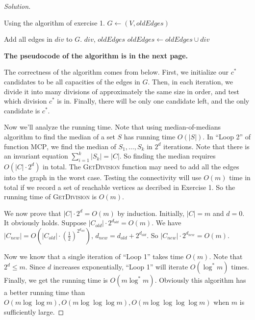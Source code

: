 \begin{proof}[Solution]
\begin{algorithm}
\begin{algorithmic}
                \bigskip
                
                 \Comment Using the algorithm of exercise 1.
                    \State $G\gets (V, oldEdges)$
                    
                        \State Add all edges in $div$ to $G$.
                            \State \Return $div$, $oldEdges$
                        \Else
                            \State $oldEdges \gets oldEdges \cup div$
                        \EndIf
                    \EndFor
                \EndFunction
            \end{algorithmic}
        \end{algorithm}
    
        {\bf The pseudocode of the algorithm is in the next page.}
    
        The correctness of the algorithm comes from below.
        First, we initialize our $c^*$ candidates to be all capacities of the edges in $G$.
        Then, in each iteration, we divide it into many divisions of approximately the same size in order, and test which division $c^*$ is in.
        Finally, there will be only one candidate left, and the only candidate is $c^*$.

        Now we'll analyze the running time.
        Note that using median-of-medians algorithm to find the median of a set $S$ has running time $O(|S|)$.
        In ``Loop 2'' of function \textsc{MCP}, we find the median of $S_1,\ldots,S_k$ in $2^d$ iterations.
        Note that there is an invariant equation $\sum_{i=1}^{k}|S_k|=|C|$.
        So finding the median requires $O(|C|\cdot 2^{d})$ in total.
        The \textsc{GetDivision} function may need to add all the edges into the graph in the worst case.
        Testing the connectivity will use $O(m)$ time in total if we record a set of reachable vertices as decribed in Exercise 1.
        So the running time of \textsc{GetDivision} is $O(m)$.

        We now prove that $|C|\cdot 2^{d}=O(m)$ by induction.
        Initially, $|C|=m$ and $d=0$.
        It obviously holds.
        Suppose $|C_{old}|\cdot 2^{d_{old}}=O(m)$.
        We have $|C_{new}|=O(|C_{old}|\cdot (\frac{1}{2})^{2^{d_{old}}})$,
        $d_{new}=d_{old}+2^{d_{old}}$.
        So  $|C_{new}|\cdot 2^{d_{new}}=O(m)$.

        Now we know that a single iteration of ``Loop 1'' takes time $O(m)$.
        Note that $2^{d}\leqslant m$.
        Since $d$ increases exponentially, ``Loop 1'' will iterate $O(\log^*m)$ times.
        Finally, we get the running time is $O(m\log^*m)$.
        Obviously this algorithm has a better running time than $O(m\log\log m),O(m\log\log\log m),O(m\log\log\log\log m)$ when $m$ is sufficiently large.
    \end{proof}

